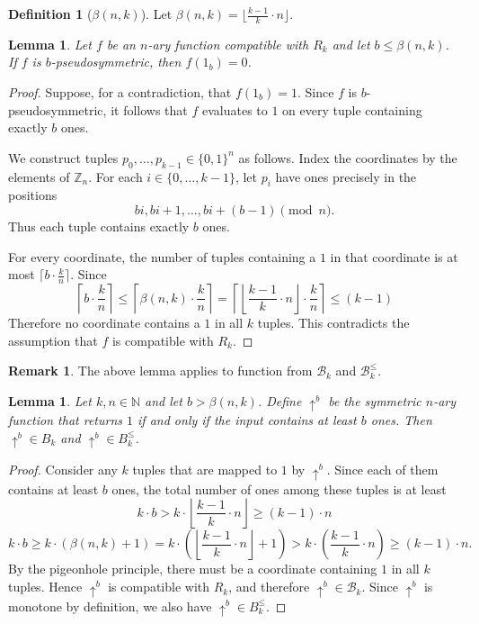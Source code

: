 \documentclass{amsart}
\numberwithin{equation}{section}
\theoremstyle{plain}
\newtheorem{lemma}[theorem]{Lemma}
\theoremstyle{definition}
\newtheorem{definition}[theorem]{Definition}
\newtheorem{remark}[theorem]{Remark}
\def\relation#1{#1}
\def\clone#1{\mathcal{#1}}
\def\Bc{\clone{B}}
\def\atleast#1{\uparrow^{#1}}
\begin{document}
\begin{definition}[$\beta(n,k)$]
Let $\beta(n,k) = \lfloor\frac{k-1}{k}\cdot n\rfloor$.
\end{definition}

\begin{lemma}
Let $f$ be an $n$-ary function compatible with $\relation{R}_k$ and let $b \leq \beta(n,k)$. If $f$ is $b$-pseudosymmetric, then $f(1_b) = 0$.
\end{lemma}
\begin{proof}
Suppose, for a contradiction, that $f(1_b)=1$. Since $f$ is $b$-pseudosymmetric, it follows that $f$ evaluates to $1$ on every tuple containing exactly $b$ ones. 

We construct tuples $p_0,\dots,p_{k-1}\in\{0,1\}^n$ as follows. Index the coordinates by the elements of $\mathbb Z_n$. 
For each $i\in\{0,\dots,k-1\}$, let $p_i$ have ones precisely in the positions
$$bi, bi+1,\dots, bi+(b-1) \pmod n.$$
Thus each tuple contains exactly $b$ ones.

For every coordinate, the number of tuples containing a $1$ in that coordinate is at most $\lceil b\cdot \frac{k}{n}\rceil$. Since  
$$\left\lceil b\cdot \frac{k}{n}\right\rceil \leq \left\lceil\beta(n,k)\cdot \frac{k}{n}\right\rceil = \left\lceil\left\lfloor\frac{k-1}{k}\cdot n\right\rfloor \cdot \frac{k}{n}\right\rceil \leq (k-1)$$
Therefore no coordinate contains a $1$ in all $k$ tuples. This contradicts the assumption that $f$ is compatible with $\relation{R}_k$.
\end{proof}

\begin{remark}
The above lemma applies to function from $\Bc_k$ and $\Bc_k^\leq$.
\end{remark}

\begin{lemma}
Let $k,n\in \mathbb{N}$ and let $b > \beta(n,k)$. Define $\atleast{b}$ be the symmetric $n$-ary function that returns $1$ if and only if the input contains at least $b$ ones. Then $\atleast{b}\in B_k$ and $\atleast{b}\in B^\leq_k$.
\end{lemma}
\begin{proof}
Consider any $k$ tuples that are mapped to $1$ by $\atleast{b}$. Since each of them contains at least $b$ ones, the total number of ones among these tuples is at least
$$k\cdot b >  k\cdot \left\lfloor\frac{k-1}{k}\cdot n\right\rfloor \geq (k-1)\cdot n$$
$$k\cdot b \geq k\cdot(\beta(n,k)+1) = k\cdot \left(\left\lfloor\frac{k-1}{k}\cdot n\right\rfloor + 1\right) > k\cdot \left(\frac{k-1}{k}\cdot n\right) \geq (k-1)\cdot n.$$
By the pigeonhole principle, there must be a coordinate containing $1$ in all $k$ tuples. Hence $\atleast{b}$ is compatible with $\relation{R}_k$, and therefore $\atleast{b}\in\Bc_k$.
Since $\atleast{b}$ is monotone by definition, we also have $\atleast{b}\in B_k^\leq$.
\end{proof}
\end{document}
